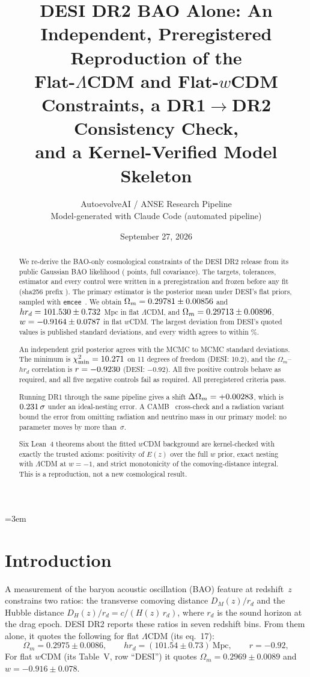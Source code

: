 \documentclass[11pt]{article}
\title{DESI DR2 BAO Alone: An Independent, Preregistered Reproduction of the\\
Flat-$\Lambda$CDM and Flat-$w$CDM Constraints, a DR1$\to$DR2 Consistency Check,\\
and a Kernel-Verified Model Skeleton}
\author{AutoevolveAI / ANSE Research Pipeline\\
\small Model-generated with Claude Code (automated pipeline)}
\date{September 27, 2026}
\begin{document}
\sloppy\emergencystretch=3em
\maketitle

\begin{abstract}
We re-derive the BAO-only cosmological constraints of the DESI DR2 release
\cite{desi2025dr2} from its public Gaussian BAO likelihood (\NData{} points,
full covariance). The targets, tolerances, estimator and every control were
written in a preregistration and frozen before any fit
(sha256 prefix \texttt{\PreregSha}). The primary estimator is the posterior
mean under DESI's flat priors, sampled with \texttt{emcee}~\EmceeVersion. We
obtain $\Omega_m=0.29781\pm0.00856$ and $hr_d=101.530\pm0.732$~Mpc in flat
$\Lambda$CDM, and $\Omega_m=0.29713\pm0.00896$, $w=-0.9164\pm0.0787$ in flat
$w$CDM. The largest deviation from DESI's quoted values is \MaxAbsPull{}
published standard deviations, and every width agrees to within
\MaxWidthDevPct\%.

An independent grid posterior agrees with the MCMC to \EmGridMax{} MCMC
standard deviations. The minimum is $\chi^2_{\min}=10.271$ on 11 degrees
of freedom (DESI: 10.2), and the $\Omega_m$--$hr_d$ correlation is
$r=-0.9230$ (DESI: $-0.92$). All five positive controls behave as
required, and all five negative controls fail as required. All
\NCriteria{} preregistered criteria pass.

Running DR1 through the same pipeline gives a shift
$\Delta\Omega_m=+0.00283$, which is $0.231\,\sigma$ under an
ideal-nesting error. A CAMB~\CambVersion{} cross-check and a radiation
variant bound the error from omitting radiation and neutrino mass in our
primary model: no parameter moves by more than \SystMaxShift\,$\sigma$.

Six Lean~4 theorems about the fitted $w$CDM background are kernel-checked
with exactly the trusted axioms: positivity of $E(z)$ over the full
$w$ prior, exact nesting with $\Lambda$CDM at $w=-1$, and strict
monotonicity of the comoving-distance integral. This is a reproduction, not
a new cosmological result.
\end{abstract}

\section{Introduction}

A measurement of the baryon acoustic oscillation (BAO) feature at
redshift~$z$ constrains two ratios: the transverse comoving distance
$D_M(z)/r_d$ and the Hubble distance $D_H(z)/r_d=c/(H(z)\,r_d)$, where
$r_d$ is the sound horizon at the drag epoch. DESI DR2 \cite{desi2025dr2}
reports these ratios in seven redshift bins. From them alone, it quotes the
following for flat $\Lambda$CDM (its eq.~17):
\[
\Omega_m=0.2975\pm0.0086,\qquad hr_d=(101.54\pm0.73)\ \mathrm{Mpc},\qquad r=-0.92,
\]
For flat $w$CDM (its Table~V, row ``DESI'') it quotes
$\Omega_m=0.2969\pm0.0089$ and $w=-0.916\pm0.078$.
\end{document}
